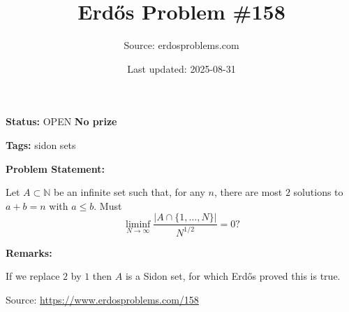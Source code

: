 \documentclass{article}
\title{Erd\H{o}s Problem \#158}
\date{Last updated: 2025-08-31}
\author{Source: erdosproblems.com}
\begin{document}
\maketitle

\noindent\textbf{Status:} OPEN \quad \textbf{No prize}

\noindent\textbf{Tags:} sidon sets

\medskip
\noindent\textbf{Problem Statement:}

Let $A\subset \mathbb{N}$ be an infinite set such that, for any $n$, there are most $2$ solutions to $a+b=n$ with $a\leq b$. Must\[\liminf_{N\to\infty}\frac{\lvert A\cap \{1,\ldots,N\}\rvert}{N^{1/2}}=0?\]

\bigskip
\noindent\textbf{Remarks:}

If we replace $2$ by $1$ then $A$ is a Sidon set, for which Erd\H{o}s proved this is true.

\bigskip
\noindent\small{Source: \url{https://www.erdosproblems.com/158}}
\end{document}
